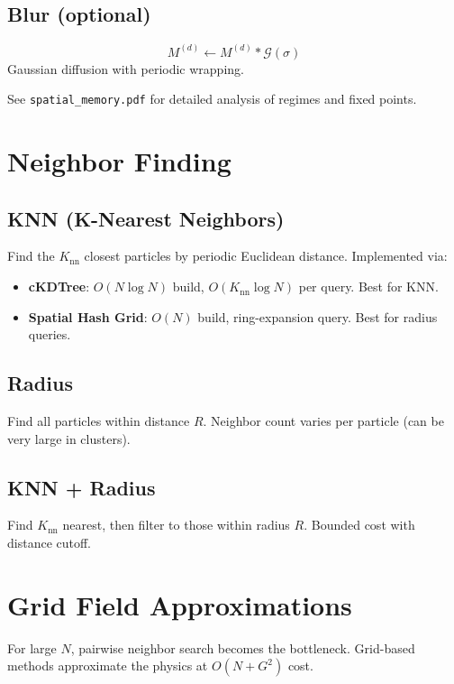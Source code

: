 \documentclass[11pt,a4paper]{article}
\begin{document}
\subsection{Blur (optional)}
\begin{equation}
M^{(d)} \leftarrow M^{(d)} * \mathcal{G}(\sigma)
\end{equation}
Gaussian diffusion with periodic wrapping.

See \texttt{spatial\_memory.pdf} for detailed analysis of regimes and fixed points.

\section{Neighbor Finding}

\subsection{KNN (K-Nearest Neighbors)}
Find the $K_{\mathrm{nn}}$ closest particles by periodic Euclidean distance. Implemented via:
\begin{itemize}[nosep]
\item \textbf{cKDTree}: $O(N \log N)$ build, $O(K_{\mathrm{nn}} \log N)$ per query. Best for KNN.
\item \textbf{Spatial Hash Grid}: $O(N)$ build, ring-expansion query. Best for radius queries.
\end{itemize}

\subsection{Radius}
Find all particles within distance $R$. Neighbor count varies per particle (can be very large in clusters).

\subsection{KNN + Radius}
Find $K_{\mathrm{nn}}$ nearest, then filter to those within radius $R$. Bounded cost with distance cutoff.

\section{Grid Field Approximations}

For large $N$, pairwise neighbor search becomes the bottleneck. Grid-based methods approximate the physics at $O(N + G^2)$ cost.
\end{document}
